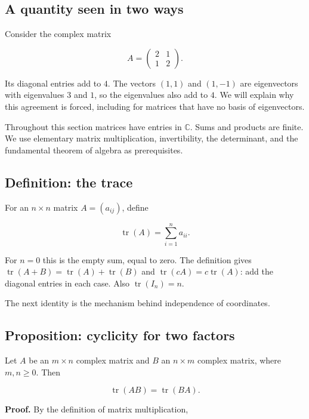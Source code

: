 \subsection{A quantity seen in two ways}\label{a-quantity-seen-in-two-ways}

Consider the complex matrix

\[
A=\begin{pmatrix}2&1\\1&2\end{pmatrix}.
\]

Its diagonal entries add to \(4\). The vectors \((1,1)\) and \((1,-1)\) are eigenvectors with eigenvalues \(3\) and \(1\), so the eigenvalues also add to \(4\). We will explain why this agreement is forced, including for matrices that have no basis of eigenvectors.

Throughout this section matrices have entries in \(\mathbb C\). Sums and products are finite. We use elementary matrix multiplication, invertibility, the determinant, and the fundamental theorem of algebra as prerequisites.

\subsection{Definition: the trace}\label{definition-the-trace}

For an \(n\times n\) matrix \(A=(a_{ij})\), define

\[
\operatorname{tr}(A)=\sum_{i=1}^{n}a_{ii}.
\]

For \(n=0\) this is the empty sum, equal to zero. The definition gives \(\operatorname{tr}(A+B)=\operatorname{tr}(A)+\operatorname{tr}(B)\) and \(\operatorname{tr}(cA)=c\operatorname{tr}(A)\): add the diagonal entries in each case. Also \(\operatorname{tr}(I_n)=n\).

The next identity is the mechanism behind independence of coordinates.

\subsection{Proposition: cyclicity for two factors}\label{linear-algebra.trace-cyclic}

Let \(A\) be an \(m\times n\) complex matrix and \(B\) an \(n\times m\) complex matrix, where \(m,n\geq0\). Then

\[
\operatorname{tr}(AB)=\operatorname{tr}(BA).
\]

\textbf{Proof.} By the definition of matrix multiplication,

